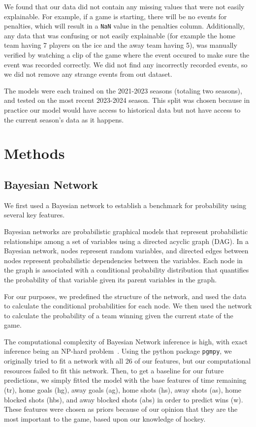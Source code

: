\documentclass[11pt]{article}
\begin{document}
We found that our data did not contain any missing values that were not easily explainable. For example, if a game is starting, there will be no
events for penalties, which will result in a {\tt NaN} value in the penalties column. Additionally, any data that was confusing or not easily explainable
(for example the home team having 7 players on the ice and the away team having 5), was manually verified by watching a clip of the game where
the event occured to make sure the event was recorded correctly. We did not find any incorrectly recorded events, so we 
did not remove any strange events from out dataset.

The models were each trained on the 2021-2023 seasons (totaling two seasons), and tested on the most recent 2023-2024 season. This split was chosen because in practice our model would have access to historical data but not have access to the current season's data as it happens.

\section{Methods}

\subsection{Bayesian Network}
We first used a Bayesian network to establish a benchmark for probability using several key features.

Bayesian networks are probabilistic graphical models that represent probabilistic relationships among a set of variables using a directed acyclic graph (DAG). 
In a Bayesian network, nodes represent random variables, and directed edges between nodes represent probabilistic dependencies between the variables. Each node in the graph is associated with a conditional probability distribution that quantifies the probability of that variable given its parent variables in the graph.

For our purposes, we predefined the structure of the network, and used the data to calculate the conditional probabilities for each node. We then used the network to calculate the probability of a team winning given the current state of the game.

The computational complexity of Bayesian Network inference is high, with exact inference being an NP-hard problem~\cite{pmlr-vR0-chickering95a}. 
Using the python package {\tt pgmpy}, we originally tried to fit a network with all 26 of our features, but our computational resources failed to fit this network.
Then, to get a baseline for our future predictions, we simply fitted the model with the base features of time remaining (tr), home goals (hg), away goals (ag), home shots (hs), away shots (as), home blocked shots (hbs), and away blocked shots (abs) in order to predict wins (w). 
These features were chosen as priors because of our opinion that they are the most important to the game, based upon our knowledge of hockey.
\end{document}
